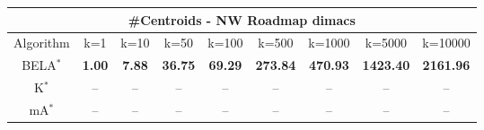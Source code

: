 \begin{tabular}{c|cccccccc}\toprule
\multicolumn{9}{c}{#Centroids - NW Roadmap dimacs}\\ \midrule
Algorithm & k=1 & k=10 & k=50 & k=100 & k=500 & k=1000 & k=5000 & k=10000 \\ \midrule
BELA$^*$ & \textbf{1.00} & \textbf{7.88} & \textbf{36.75} & \textbf{69.29} & \textbf{273.84} & \textbf{470.93} & \textbf{1423.40} & \textbf{2161.96} \\
K$^*$ & -- & -- & -- & -- & -- & -- & -- & -- \\
mA$^*$ & -- & -- & -- & -- & -- & -- & -- & -- \\ \bottomrule 
\end{tabular}
